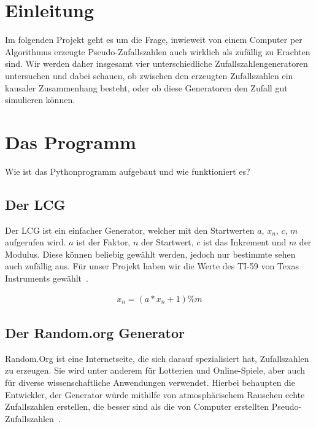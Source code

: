 \documentclass[12pt]{article}
\title{\testbf{Zufallszahlen Spektraltest}}
\author{Christian Locatelli, Alexander Wallrodt}
\date{\today}
\begin{document}
    \maketitle
    \clearpage

    \tableofcontents
    \listoffigures
    \listoftables
    \clearpage


    \section{Einleitung}\label{sec:Einleitung}
    Im folgenden Projekt geht es um die Frage, inwieweit von einem Computer per Algorithmus erzeugte Pseudo-Zufallszahlen
    auch wirklich als zufällig zu Erachten sind.
    Wir werden daher insgesamt vier unterschiedliche Zufallszahlengeneratoren untersuchen und dabei schauen,
    ob zwischen den erzeugten Zufallszahlen ein kausaler Zusammenhang besteht,
    oder ob diese Generatoren den Zufall gut simulieren können.



    \section{Das Programm}\label{sec:das-programm}
    Wie ist das Pythonprogramm aufgebaut und wie funktioniert es?
    \subsection{Der LCG}\label{subsec:der-lcg}
    Der LCG ist ein einfacher Generator, welcher mit den Startwerten $a$, $x_n$, $c$, $m$ aufgerufen wird.
    $a$ ist der Faktor, $n$ der Startwert, $c$ ist das Inkrement und $m$ der Modulus.
    Diese können beliebig gewählt werden, jedoch nur bestimmte sehen auch zufällig aus.
    Für unser Projekt haben wir die Werte des TI-59 von Texas Instruments gewählt~\cite{lcg}.

    \begin{align*}
    x_n = (a * x_n + 1) \% m
    \end{align*}

    \subsection{Der Random.org Generator}\label{subsec:der-random.org-generator}
    Random.Org ist eine Internetseite, die sich darauf spezialisiert hat, Zufallszahlen zu erzeugen.
    Sie wird unter anderem für Lotterien und Online-Spiele, aber auch für diverse wissenschaftliche
    Anwendungen verwendet.
    Hierbei behaupten die Entwickler, der Generator würde mithilfe von atmosphärischem
    Rauschen echte Zufallszahlen erstellen, die besser sind als die von Computer erstellten Pseudo-Zufallszahlen~\cite{random-org}.
\end{document}
